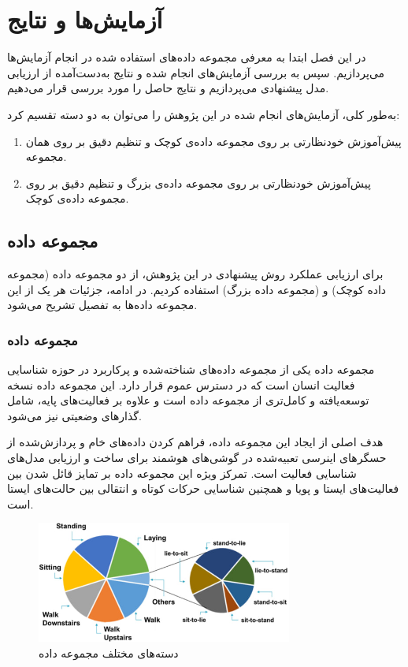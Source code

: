 \chapter{آزمایش‌ها و نتایج}

در این فصل ابتدا به معرفی مجموعه داده‌های استفاده شده در انجام آزمایش‌ها می‌پردازیم. سپس به بررسی آزمایش‌های انجام شده و نتایج به‌دست‌آمده از ارزیابی مدل پیشنهادی می‌پردازیم و نتایج حاصل را مورد بررسی قرار می‌دهیم.

به‌طور کلی، آزمایش‌های انجام شده در این پژوهش را می‌توان به دو دسته تقسیم کرد:
\begin{enumerate}
    \item پیش‌آموزش خودنظارتی بر روی مجموعه داده‌ی کوچک و تنظیم دقیق بر روی همان مجموعه.
    \item پیش‌آموزش خودنظارتی بر روی مجموعه داده‌ی بزرگ و تنظیم دقیق بر روی مجموعه داده‌ی کوچک.
\end{enumerate}

\section{مجموعه داده}

برای ارزیابی عملکرد روش پیشنهادی در این پژوهش، از دو مجموعه داده \cite{reyes2015smartphone}
(مجموعه داده کوچک) و
\cite{vavoulas2016mobiact}
(مجموعه داده بزرگ)
استفاده کردیم. در ادامه، جزئیات هر یک از این مجموعه داده‌ها به تفصیل تشریح می‌شود.

\subsection{مجموعه داده }

مجموعه داده 
یکی از مجموعه داده‌های شناخته‌شده و پرکاربرد در حوزه شناسایی فعالیت انسان است که در دسترس عموم قرار دارد. این مجموعه داده نسخه توسعه‌یافته و کامل‌تری از مجموعه داده
\cite{anguita2013public}
است و علاوه بر فعالیت‌های پایه، شامل گذارهای وضعیتی نیز می‌شود.

هدف اصلی از ایجاد این مجموعه داده، فراهم کردن داده‌های خام و پردازش‌شده از حسگرهای اینرسی تعبیه‌شده در گوشی‌های هوشمند برای ساخت و ارزیابی مدل‌های شناسایی فعالیت است. تمرکز ویژه این مجموعه داده بر تمایز قائل شدن بین فعالیت‌های ایستا و پویا و همچنین شناسایی حرکات کوتاه و انتقالی بین حالت‌های ایستا است.

\begin{figure}[htb!]
\centering
\includegraphics[width=0.75\textwidth]{Images/Chapter4/hapt-classes.png}
\caption{دسته‌های مختلف مجموعه داده }
\label{fig:hapt-classes}
\end{figure}

